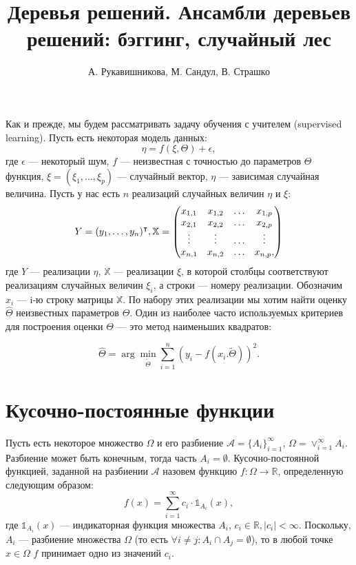 \documentclass[12pt,a4paper]{article}
\begin{document}
\title{Деревья решений. Ансамбли деревьев решений: бэггинг, случайный лес}
\author{А. Рукавишникова, М. Сандул, В. Страшко}
\maketitle

Как и прежде, мы будем рассматривать задачу обучения с учителем (supervised learning). Пусть есть некоторая модель данных:
\begin{equation*}
\eta = f(\xi, \Theta) + \epsilon,
\end{equation*}
где $\epsilon$ --- некоторый шум, $f$ --- неизвестная с точностью до параметров $\Theta$ функция, $\xi = (\xi_1, \ldots, \xi_p)$ --- случайный вектор, $\eta$ --- зависимая случайная величина. Пусть у нас есть $n$ реализаций случайных величин $\eta$ и $\xi$:
\begin{equation*}
Y = (y_1, \ldots, y_n)^\intercal,\\
\mathbb X =  
\begin{pmatrix} 
x_{1, 1} & x_{1, 2} & \ldots & x_{1, p} \\
x_{2, 1} & x_{2, 2} & \ldots & x_{2, p} \\
\vdots & \vdots & \ldots & \vdots\\
x_{n, 1} & x_{n, 2} & \ldots & x_{n, p},
\end{pmatrix} 
\end{equation*}
где $Y$ --- реализации $\eta$, $\mathbb X$ --- реализации $\xi$, в которой столбцы соответствуют реализациям случайных величин $\xi_i$, а строки --- номеру реализации. Обозначим $x_i$ --- i-ю строку матрицы $\mathbb X$. По набору этих реализации мы хотим найти оценку $\hat\Theta$ неизвестных параметров $\Theta$. Один из наиболее часто используемых критериев для построения оценки $\Theta$ --- это метод наименьших квадратов:

\begin{equation*}
\hat\Theta = \arg \min_{\tilde\Theta} \sum_{i=1}^{n}{(y_i - f(x_i. \tilde\Theta))^2}.
\end{equation*} 

\section{Кусочно-постоянные функции}

Пусть есть некоторое множество $\Omega$ и его разбиение $\mathcal A = \{A_i\}_{i=1}^{\infty}$,  $\Omega = \vee_{i=1}^{\infty}{A_i}$. Разбиение может быть конечным, тогда часть $A_i = \emptyset$. Кусочно-постоянной функцией, заданной на разбиении $\mathcal A$ назовем функцию $f: \Omega \rightarrow \mathbb R$, определенную следующим образом: \
\begin{equation*}
f(x) = \sum_{i=1}^{\infty}{c_i \cdot \mathds{1}_{A_i}(x)},
\end{equation*}
где $\mathds{1}_{A_i}(x)$ --- индикаторная функция множества $A_i$, $c_i \in \mathbb R, |c_i| < \infty$. Поскольку, $A_i$ --- разбиение множества $\Omega$ (то есть $\forall i \neq j: A_i \cap A_j = \emptyset$), то в любой точке $x \in \Omega$  $f$ принимает одно из значений $c_i$.\par
\end{document}
